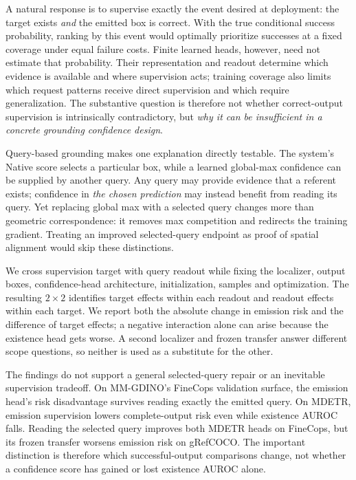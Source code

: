 \documentclass[10pt,twocolumn,letterpaper]{article}
\begin{document}
A natural response is to supervise exactly the event desired at deployment:
the target exists \emph{and} the emitted box is correct. With the true
conditional success probability, ranking by this event would optimally
prioritize successes at a fixed coverage under equal failure costs.
Finite learned heads, however, need not estimate that probability.
Their representation and readout determine which evidence is available
and where supervision acts; training coverage also limits which request
patterns receive direct supervision and which require generalization.
The substantive question is therefore not
whether correct-output supervision is intrinsically contradictory, but
\emph{why it can be insufficient in a concrete grounding confidence design}.

Query-based grounding makes one explanation directly testable. The system's
Native score selects a particular box, while a learned global-max confidence
can be supplied by another query. Any query may provide evidence that a
referent exists; confidence in \emph{the chosen prediction} may instead
benefit from reading its query. Yet replacing global max with a selected
query changes more than geometric correspondence: it removes max competition
and redirects the training gradient. Treating an improved selected-query
endpoint as proof of spatial alignment would skip these distinctions.

We cross supervision target with query readout while fixing the localizer,
output boxes, confidence-head architecture, initialization, samples and
optimization. The resulting $2\times2$ identifies target effects within
each readout and readout effects within each target. We report both the
absolute change in emission risk and the difference of target effects;
a negative interaction alone can arise because the existence head gets
worse. A second localizer and frozen transfer answer different scope
questions, so neither is used as a substitute for the other.

The findings do not support a general selected-query repair or an
inevitable supervision tradeoff. On MM-GDINO's FineCops validation surface, the emission head's risk
disadvantage survives reading exactly the emitted query. On MDETR,
emission supervision lowers complete-output risk even while existence
AUROC falls. Reading the selected query improves both MDETR heads on
FineCops, but its frozen transfer worsens emission risk on gRefCOCO.
The important distinction is therefore which successful-output
comparisons change, not whether a confidence score has gained or lost
existence AUROC alone.
\end{document}
